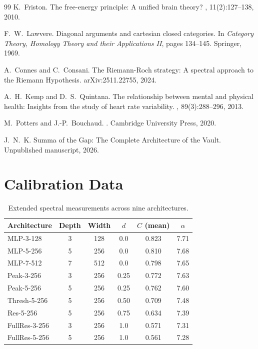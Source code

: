 \documentclass[12pt,a4paper]{article}
\begin{document}
\begin{thebibliography}{99}
K.~Friston.
\newblock The free-energy principle: A unified brain theory?
, 11(2):127--138, 2010.

F.~W.~Lawvere.
\newblock Diagonal arguments and cartesian closed categories.
\newblock In {\em Category Theory, Homology Theory and their Applications II}, pages 134--145.
\newblock Springer, 1969.

A.~Connes and C.~Consani.
\newblock The Riemann-Roch strategy: A spectral approach to the Riemann Hypothesis.
\newblock arXiv:2511.22755, 2024.

A.~H.~Kemp and D.~S.~Quintana.
\newblock The relationship between mental and physical health: Insights from the study of heart rate variability.
, 89(3):288--296, 2013.

M.~Potters and J.-P.~Bouchaud.
.
\newblock Cambridge University Press, 2020.

J.~N.~K.
\newblock Summa of the Gap: The Complete Architecture of the Vault.
\newblock Unpublished manuscript, 2026.

\end{thebibliography}


\appendix
\section{Calibration Data}

\begin{table}[h]
\centering
\caption{Extended spectral measurements across nine architectures.}
\begin{tabular}{lccccc}
\toprule
Architecture & Depth & Width & $d$ & $C$ (mean) & $\alpha$ \\
\midrule
MLP-3-128 & 3 & 128 & 0.0 & 0.823 & 7.71 \\
MLP-5-256 & 5 & 256 & 0.0 & 0.810 & 7.68 \\
MLP-7-512 & 7 & 512 & 0.0 & 0.798 & 7.65 \\
Peak-3-256 & 3 & 256 & 0.25 & 0.772 & 7.63 \\
Peak-5-256 & 5 & 256 & 0.25 & 0.762 & 7.60 \\
Thresh-5-256 & 5 & 256 & 0.50 & 0.709 & 7.48 \\
Res-5-256 & 5 & 256 & 0.75 & 0.634 & 7.39 \\
FullRes-3-256 & 3 & 256 & 1.0 & 0.571 & 7.31 \\
FullRes-5-256 & 5 & 256 & 1.0 & 0.561 & 7.28 \\
\bottomrule
\end{tabular}
\end{table}
\end{document}
